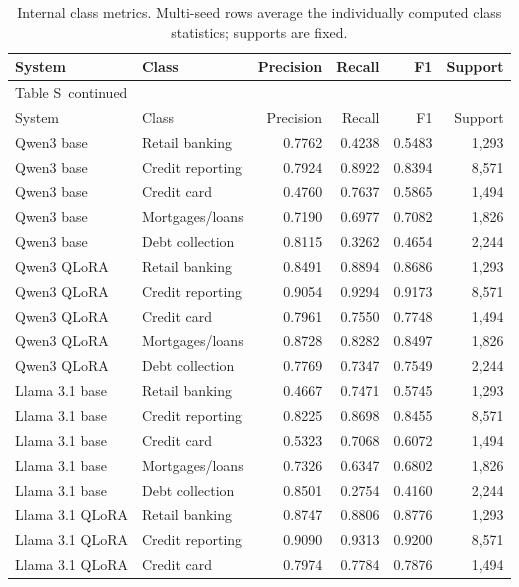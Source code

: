 \documentclass[10pt,a4paper]{article}
\renewcommand{\thetable}{S\arabic{table}}
\begin{document}
{\footnotesize
\setlength{\tabcolsep}{4pt}
\begin{longtable}{@{}llrrrr@{}}
\caption{Internal class metrics. Multi-seed rows average the individually computed class statistics; supports are fixed.}\label{sup:class-metrics}\\
\toprule
System & Class & Precision & Recall & F1 & Support \\
\midrule\endfirsthead
\multicolumn{6}{l}{\small Table \thetable\ continued}\\
\toprule
System & Class & Precision & Recall & F1 & Support \\
\midrule\endhead
\bottomrule\endfoot
Qwen3 base & Retail banking & 0.7762 & 0.4238 & 0.5483 & 1,293 \\
Qwen3 base & Credit reporting & 0.7924 & 0.8922 & 0.8394 & 8,571 \\
Qwen3 base & Credit card & 0.4760 & 0.7637 & 0.5865 & 1,494 \\
Qwen3 base & Mortgages/loans & 0.7190 & 0.6977 & 0.7082 & 1,826 \\
Qwen3 base & Debt collection & 0.8115 & 0.3262 & 0.4654 & 2,244 \\
Qwen3 QLoRA & Retail banking & 0.8491 & 0.8894 & 0.8686 & 1,293 \\
Qwen3 QLoRA & Credit reporting & 0.9054 & 0.9294 & 0.9173 & 8,571 \\
Qwen3 QLoRA & Credit card & 0.7961 & 0.7550 & 0.7748 & 1,494 \\
Qwen3 QLoRA & Mortgages/loans & 0.8728 & 0.8282 & 0.8497 & 1,826 \\
Qwen3 QLoRA & Debt collection & 0.7769 & 0.7347 & 0.7549 & 2,244 \\
Llama 3.1 base & Retail banking & 0.4667 & 0.7471 & 0.5745 & 1,293 \\
Llama 3.1 base & Credit reporting & 0.8225 & 0.8698 & 0.8455 & 8,571 \\
Llama 3.1 base & Credit card & 0.5323 & 0.7068 & 0.6072 & 1,494 \\
Llama 3.1 base & Mortgages/loans & 0.7326 & 0.6347 & 0.6802 & 1,826 \\
Llama 3.1 base & Debt collection & 0.8501 & 0.2754 & 0.4160 & 2,244 \\
Llama 3.1 QLoRA & Retail banking & 0.8747 & 0.8806 & 0.8776 & 1,293 \\
Llama 3.1 QLoRA & Credit reporting & 0.9090 & 0.9313 & 0.9200 & 8,571 \\
Llama 3.1 QLoRA & Credit card & 0.7974 & 0.7784 & 0.7876 & 1,494 \\

\end{longtable}}
\end{document}
